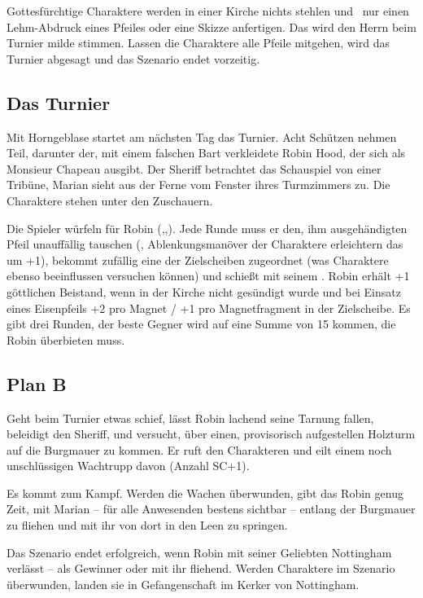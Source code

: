{		Gottesfürchtige Charaktere werden in einer Kirche nichts stehlen und \zB~nur einen Lehm-Abdruck eines Pfeiles oder eine Skizze anfertigen. Das wird den Herrn beim Turnier milde stimmen. Lassen die Charaktere alle Pfeile mitgehen, wird das Turnier abgesagt und das Szenario endet vorzeitig.

		\subsection{Das Turnier}

		Mit Horngeblase startet am nächsten Tag das Turnier. Acht Schützen nehmen Teil, darunter der, mit einem falschen Bart verkleidete Robin Hood, der sich als Monsieur Chapeau ausgibt. Der Sheriff betrachtet das Schauspiel von einer Tribüne, Marian sieht aus der Ferne vom Fenster ihres Turmzimmers zu. Die Charaktere stehen unter den Zuschauern.

		Die Spieler würfeln für Robin (,,). Jede Runde muss er den, ihm ausgehändigten Pfeil unauffällig tauschen (, Ablenkungsmanöver der Charaktere erleichtern das um +1), bekommt zufällig eine der Zielscheiben zugeordnet (was Charaktere ebenso beeinflussen versuchen können) und schießt mit seinem . Robin erhält +1 göttlichen Beistand, wenn in der Kirche nicht gesündigt wurde und bei Einsatz eines Eisenpfeils +2 pro Magnet / +1 pro Magnetfragment in der Zielscheibe. Es gibt drei Runden, der beste Gegner wird auf eine Summe von 15 kommen, die Robin überbieten muss.

		\subsection{Plan B}

		Geht beim Turnier etwas schief, lässt Robin lachend seine Tarnung fallen, beleidigt den Sheriff, und versucht, über einen, provisorisch aufgestellen Holzturm auf die Burgmauer zu kommen. Er ruft den Charakteren  und eilt einem noch unschlüssigen Wachtrupp davon (Anzahl SC+1).

		Es kommt zum Kampf. Werden die Wachen überwunden, gibt das Robin genug Zeit, mit Marian -- für alle Anwesenden bestens sichtbar -- entlang der Burgmauer zu fliehen und mit ihr von dort in den Leen zu springen.


		\noindent
		Das Szenario endet erfolgreich, wenn Robin mit seiner Geliebten Nottingham verlässt -- als Gewinner oder mit ihr fliehend. Werden Charaktere im Szenario überwunden, landen sie in Gefangenschaft im Kerker von Nottingham.
}
